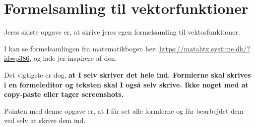 \documentclass[a4paper, 12pt]{article}
\begin{document}
\section*{Formelsamling til vektorfunktioner}
\label{sec:org7c59697}

Jeres sidste opgave er, at skrive jeres egen formelsamling til vektorfunktioner.

I kan se formelsamlingen fra matematikbogen her: \url{https://matahtx.systime.dk/?id=p386}, og lade jer inspirere af den.

Det vigtigste er dog, \textbf{at I selv skriver det hele ind. Formlerne skal skrives i en formeleditor og teksten skal I også selv skrive. Ikke noget med at copy-paste eller tager screenshots.}

Pointen med denne opgave er, at I får set alle formlerne og får bearbejdet dem ved selv at skrive dem ind.
\end{document}
